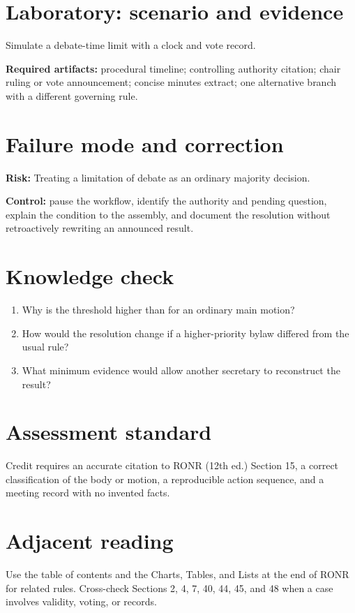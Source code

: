 \documentclass[11pt]{article}
\begin{document}
\section{Laboratory: scenario and evidence}
Simulate a debate-time limit with a clock and vote record.

\textbf{Required artifacts:} procedural timeline; controlling authority citation; chair ruling or vote announcement; concise minutes extract; one alternative branch with a different governing rule.

\section{Failure mode and correction}
\textbf{Risk:} Treating a limitation of debate as an ordinary majority decision.

\textbf{Control:} pause the workflow, identify the authority and pending question, explain the condition to the assembly, and document the resolution without retroactively rewriting an announced result.

\section{Knowledge check}
\begin{enumerate}[leftmargin=*,itemsep=4pt]
\item Why is the threshold higher than for an ordinary main motion?
\item How would the resolution change if a higher-priority bylaw differed from the usual rule?
\item What minimum evidence would allow another secretary to reconstruct the result?
\end{enumerate}

\section{Assessment standard}
Credit requires an accurate citation to RONR (12th ed.) Section 15, a correct classification of the body or motion, a reproducible action sequence, and a meeting record with no invented facts.

\section{Adjacent reading}
Use the table of contents and the Charts, Tables, and Lists at the end of RONR for related rules. Cross-check Sections 2, 4, 7, 40, 44, 45, and 48 when a case involves validity, voting, or records.
\end{document}

